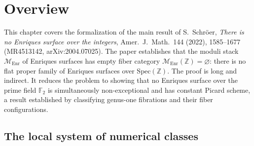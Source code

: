 \chapter{Overview}
\label{chap:overview}


\providecommand{\ZZ}{\mathbb{Z}}
\providecommand{\FF}{\mathbb{F}}
\providecommand{\RR}{\mathbb{R}}
\providecommand{\QQ}{\mathbb{Q}}
\providecommand{\Spec}{\mathrm{Spec}}
\providecommand{\Num}{\mathrm{Num}}
\providecommand{\Br}{\operatorname{Br}}
\providecommand{\GG}{\mathbb{G}}
\providecommand{\foY}{\mathfrak{Y}}
\providecommand{\foX}{\mathfrak{X}}
\providecommand{\shM}{\mathscr{M}}
\providecommand{\Enr}{\mathrm{Enr}}
\providecommand{\ra}{\rightarrow}
\providecommand{\lra}{\longrightarrow}
\providecommand{\quadand}{\quad\text{and}\quad}
\providecommand{\bY}{\bar{Y}}

This chapter covers the formalization of the main result of
S.~Schr\"oer, \textit{There is no Enriques surface over the integers},
Amer.\ J.\ Math.\ 144 (2022), 1585--1677 (MR4513142, arXiv:2004.07025).
The paper establishes that the moduli stack \(\shM_{\Enr}\) of Enriques surfaces has empty fiber category
\(\shM_{\Enr}(\ZZ) = \varnothing\): there is no flat proper family of Enriques surfaces over \(\Spec(\ZZ)\).
The proof is long and indirect.
It reduces the problem to showing that no Enriques surface over the prime field \(\FF_2\) is
simultaneously non-exceptional and has constant Picard scheme,
a result established by classifying genus-one fibrations and their fiber configurations.


\section{The local system of numerical classes}

